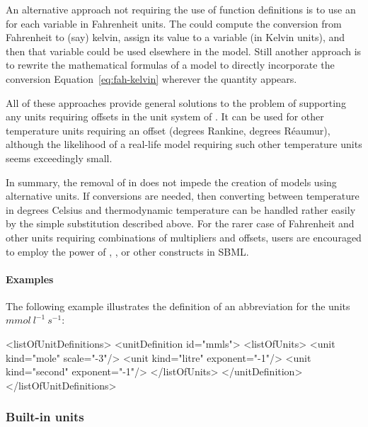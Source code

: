 \begin{itemize}
  An alternative approach not requiring the use of function
  definitions is to use an \AssignmentRule for each variable in
  Fahrenheit units.  The \AssignmentRule could compute the
  conversion from Fahrenheit to (say) kelvin, assign its value to
  a variable (in Kelvin units), and then that variable could be
  used elsewhere in the model.  Still another approach is to
  rewrite the mathematical formulas of a model to directly
  incorporate the conversion Equation~\ref{eq:fah-kelvin} wherever
  the quantity appears.

  All of these approaches provide general solutions to the problem
  of supporting any units requiring offsets in the unit system of
  \sbmltwotwo.  It can be used for other temperature units
  requiring an offset (\eg degrees Rankine, degrees R\'{e}aumur),
  although the likelihood of a real-life model requiring such
  other temperature units seems exceedingly small.

\end{itemize}

In summary, the removal of  in \sbmltwotwo does not
impede the creation of models using alternative units.  If
conversions are needed, then converting between temperature in
degrees Celsius and thermodynamic temperature can be handled
rather easily by the simple substitution described above.  For the
rarer case of Fahrenheit and other units requiring combinations of
multipliers and offsets, users are encouraged to employ the power
of \FunctionDefinition, \AssignmentRule, or other constructs in
SBML.


\paragraph{Examples}

The following example illustrates the definition of an
abbreviation  for the units $mmol\ l^{-1}\ s^{-1}$:

\begin{example}
<listOfUnitDefinitions>
    <unitDefinition id="mmls">
        <listOfUnits>
            <unit kind="mole"   scale="-3"/>
            <unit kind="litre"  exponent="-1"/>
            <unit kind="second" exponent="-1"/>
        </listOfUnits>
    </unitDefinition>
</listOfUnitDefinitions>
\end{example}


\subsubsection{Built-in units}
\label{sec:built-in-units}

